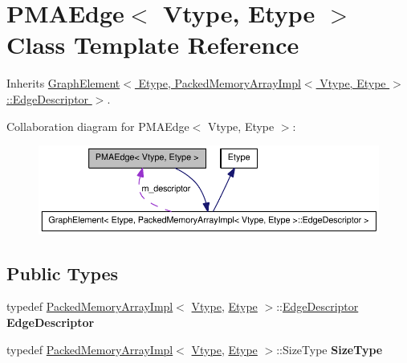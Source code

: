 \hypertarget{class_p_m_a_edge}{
\section{PMAEdge$<$ Vtype, Etype $>$ Class Template Reference}
\label{class_p_m_a_edge}
}


Inherits \hyperlink{class_graph_element}{GraphElement$<$ Etype, PackedMemoryArrayImpl$<$ Vtype, Etype $>$::EdgeDescriptor $>$}.



Collaboration diagram for PMAEdge$<$ Vtype, Etype $>$:\nopagebreak
\begin{figure}[H]
\begin{center}
\leavevmode
\includegraphics[width=400pt]{class_p_m_a_edge__coll__graph}
\end{center}
\end{figure}
\subsection*{Public Types}
\begin{DoxyCompactItemize}
\item 
\hypertarget{class_p_m_a_edge_a3f95507f0e9bd3ed2e89dabb4fb1a514}{
typedef \hyperlink{class_packed_memory_array_impl}{PackedMemoryArrayImpl}$<$ \hyperlink{class_vtype}{Vtype}, \hyperlink{class_etype}{Etype} $>$::\hyperlink{class_p_m_a_edge}{EdgeDescriptor} {\bfseries EdgeDescriptor}}
\label{class_p_m_a_edge_a3f95507f0e9bd3ed2e89dabb4fb1a514}

\item 
\hypertarget{class_p_m_a_edge_a3326600518d7a16689b56022a5fcb4cf}{
typedef \hyperlink{class_packed_memory_array_impl}{PackedMemoryArrayImpl}$<$ \hyperlink{class_vtype}{Vtype}, \hyperlink{class_etype}{Etype} $>$::SizeType {\bfseries SizeType}}
\label{class_p_m_a_edge_a3326600518d7a16689b56022a5fcb4cf}

\end{DoxyCompactItemize}
